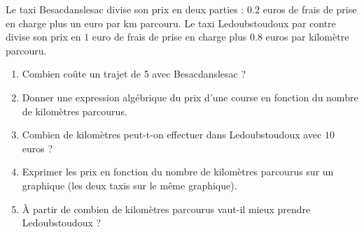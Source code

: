 
    Le taxi Besacdanslesac divise son prix en deux parties : $0.2$ euros de frais de prise en charge plus un euro par km parcouru. Le taxi Ledoubstoudoux par contre divise son prix en $1$ euro de frais de prise en charge plus $0.8$ euros par kilomètre parcouru.

    \begin{enumerate}
        \item
            Combien coûte un trajet de \unit{5}{\kilo\meter} avec Besacdanslesac ?
        \item
            Donner une expression algébrique du prix d'une course en fonction du nombre de kilomètres parcourus.
        \item
            Combien de kilomètres peut-t-on effectuer dans Ledoubstoudoux avec \( 10\) euros ?
        \item
            Exprimer les prix en fonction du nombre de kilomètres parcourus sur un graphique (les deux taxis sur le même graphique).
        \item
            À partir de combien de kilomètres parcourus vaut-il mieux prendre Ledoubstoudoux ?
    \end{enumerate}

